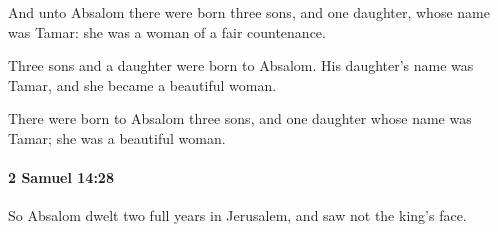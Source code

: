 			\begin{versebox}
					\item[BHS] 
					\item[ASV] And unto Absalom there were born three sons, and one daughter, whose name was Tamar: she was a woman of a fair countenance.
					\item[NIV] Three sons and a daughter were born to Absalom. His daughter’s name was Tamar, and she became a beautiful woman.
					\item[NRSV] There were born to Absalom three sons, and one daughter whose name was Tamar; she was a beautiful woman.
			\end{versebox}

		\paragraph{2 Samuel 14:28} %
			\label{2SAMUEL-14-28}

			So Absalom dwelt two full years in Jerusalem, and saw not the king’s face.

